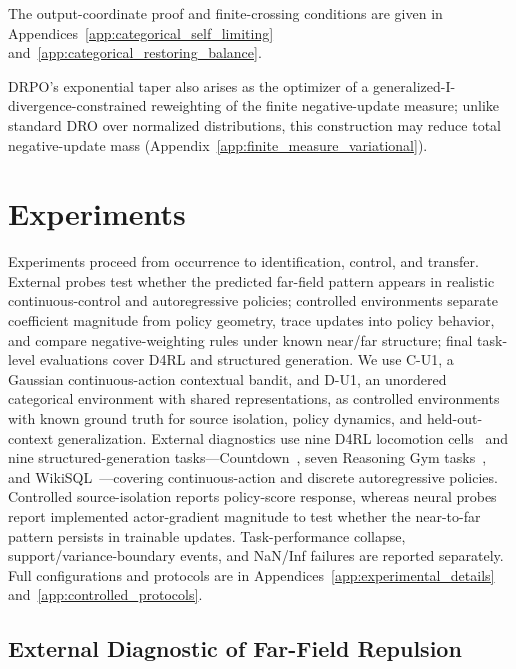 \documentclass{article}
\theoremstyle{plain}
\theoremstyle{definition}
\theoremstyle{remark}
\begin{document}
The output-coordinate proof and finite-crossing conditions are given in
Appendices~\ref{app:categorical_self_limiting}
and~\ref{app:categorical_restoring_balance}.

DRPO's exponential taper also arises as the optimizer of a
generalized-I-divergence-constrained reweighting of the finite
negative-update measure; unlike standard DRO over normalized distributions,
this construction may reduce total negative-update mass
(Appendix~\ref{app:finite_measure_variational}).

\section{Experiments}
\label{sec:experiments}

Experiments proceed from occurrence to identification, control, and transfer.
External probes test whether the predicted far-field pattern appears in
realistic continuous-control and autoregressive policies; controlled
environments separate coefficient magnitude from policy geometry, trace
updates into policy behavior, and compare negative-weighting rules under known
near/far structure; final task-level evaluations cover D4RL and structured
generation. We use C-U1, a Gaussian continuous-action contextual bandit, and
D-U1, an unordered categorical environment with shared representations, as
controlled environments with known ground truth for source isolation, policy
dynamics, and held-out-context generalization. External diagnostics use nine
D4RL locomotion cells~\citep{fu2020d4rl} and nine structured-generation
tasks---Countdown~\citep{hutton2002countdown,pan2025tinyzero}, seven Reasoning
Gym tasks~\citep{stojanovski2025reasoninggym}, and
WikiSQL~\citep{zhong2017seq2sql}---covering continuous-action and discrete
autoregressive policies. Controlled source-isolation reports policy-score
response, whereas neural probes report implemented actor-gradient magnitude
to test whether the near-to-far pattern persists in trainable updates.
Task-performance collapse, support/variance-boundary events, and NaN/Inf
failures are reported separately. Full configurations and protocols are in
Appendices~\ref{app:experimental_details} and~\ref{app:controlled_protocols}.

\subsection{External Diagnostic of Far-Field Repulsion}
\label{sec:external_far_field}
\end{document}
